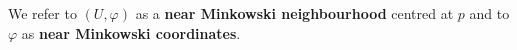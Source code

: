 \documentclass{article}
\newcommand{\Q}{\mathcal{Q}}
\newcommand{\Mw}{M_{\mathrm{wns}}}
\newtheorem{definition}{Definition}[section]
\newtheorem{remark}[definition]{Remark}
\begin{document}
We refer to $(U,\varphi)$ as a \textbf{near Minkowski neighbourhood} centred at $p$ and to $\varphi$ as \textbf{near Minkowski coordinates}. 


\end{document}

